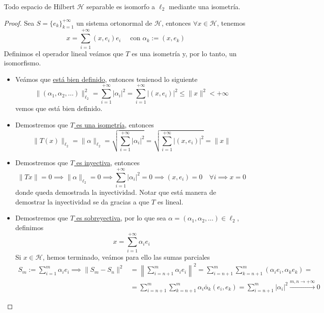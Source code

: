 \begin{teo}
    Todo espacio de Hilbert $\mathcal{H}$ separable es isomorfo a $\ell_2$ mediante una isometría.
\begin{proof}
    Sea $S = \{e_k\}_{k=1}^{+\infty}$ un sistema ortonormal de $\mathcal{H}$, entonces $\forall x \in \mathcal{H}$, tenemos 
    $$x = \sum_{i=1}^{+\infty} (x, e_i) e_i \quad \text{ con } \alpha_k := (x, e_k)$$
    Definimos el operador lineal
    veámos que $T$ es una isometría y, por lo tanto, un isomorfismo. \\
    \begin{itemize}
        \item Veámos que \underline{está bien definido}, entonces tenienod lo siguiente
        \begin{equation*}
            \|(\alpha_1, \alpha_2, \dots)\|_{\ell_2}^2 = \sum_{i=1}^{+\infty} |\alpha_i|^2 = \sum_{i=1}^{+\infty} |(x, e_i)|^2 \le \|x\|^2 < +\infty
        \end{equation*}
        vemos que está bien definido.
        \item Demostremos que \underline{$T$ es una isometría}, entonces
        \begin{equation*}
            \|T(x)\|_{\ell_2} = \|\alpha\|_{\ell_2} = \sqrt{\sum_{i=1}^{+\infty} |\alpha_i|^2} = \sqrt{\sum_{i=1}^{+\infty} |(x, e_i)|^2} = \|x\|
        \end{equation*}
        \item Demostremos que \underline{$T$ es inyectiva}, entonces
        \begin{equation*}
            \|Tx\| = 0 \implies \|\alpha\|_{\ell_2} = 0 \implies \sum_{i=1}^{+\infty} |\alpha_i|^2 = 0 \implies (x, e_i) = 0 \quad \forall i \implies x = 0
        \end{equation*}
        donde queda demostrada la inyectividad. Notar que está manera de demostrar la inyectividad se da gracias a que $T$ es lineal.
        \item Demostremos que \underline{$T$ es sobreyectiva}, por lo que sea $\alpha = (\alpha_1, \alpha_2, \dots) \in \ell_2$, definimos 
        $$x = \sum_{i=1}^{+\infty} \alpha_i e_i$$ 
        Si $x \in \mathcal{H}$, hemos terminado, veámos para ello las sumas parciales
        \begin{align*}
            S_m := \sum_{i=1}^{m} \alpha_i e_i \implies \|S_m - S_n\|^2 &= \left\| \sum_{i=n+1}^{m} \alpha_i e_i \right\|^2 = \sum_{i=n+1}^{m} \sum_{k=n+1}^{m} (\alpha_i e_i, \alpha_k e_k)= \\
            &= \sum_{i=n+1}^{m} \sum_{k=n+1}^{m} \alpha_i \bar{\alpha}_k (e_i, e_k)= \sum_{i=n+1}^{m} |\alpha_i|^2 \xrightarrow{m, n \to +\infty} 0
        \end{align*}
    \end{itemize}
\end{proof}
\end{teo}

